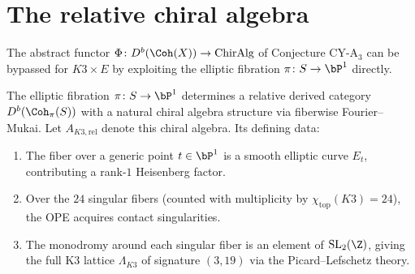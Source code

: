 \section{The relative chiral algebra}
\label{sec:k3e-relative-chiral}

The abstract functor $\Phi \colon D^b(\Coh(X)) \to \text{ChirAlg}$ of Conjecture CY-A$_3$ can be bypassed for $K3 \times E$ by exploiting the elliptic fibration $\pi \colon S \to \bP^1$ directly.

\begin{construction}
\label{constr:k3e-relative-chiral}
The elliptic fibration $\pi \colon S \to \bP^1$ determines a relative derived category $D^b(\Coh_\pi(S))$ with a natural chiral algebra structure via fiberwise Fourier--Mukai. Let $A_{K3,\mathrm{rel}}$ denote this chiral algebra. Its defining data:
\begin{enumerate}[label=(\roman*)]
 \item The fiber over a generic point $t \in \bP^1$ is a smooth elliptic curve $E_t$, contributing a rank-$1$ Heisenberg factor.
 \item Over the $24$ singular fibers (counted with multiplicity by $\chi_{\mathrm{top}}(K3) = 24$), the OPE acquires contact singularities.
 \item The monodromy around each singular fiber is an element of $\mathrm{SL}_2(\Z)$, giving the full K3 lattice $\Lambda_{K3}$ of signature $(3,19)$ via the Picard--Lefschetz theory.
\end{enumerate}
\end{construction}


